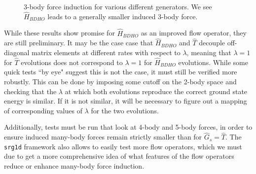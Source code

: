 \begin{figure}[th!]
\begin{center}
\end{center}
\caption{3-body force induction for various different generators. We see $\hat{H}_{BDHO}$ leads to a generally smaller induced 3-body force.}
\label{fig:heinz_newfull}
\end{figure}

While these results show promise for $\hat{H}_{BDHO}$ as an improved flow operator, they are still preliminary. It may be the case case that $\hat{H}_{BDHO}$ and $\hat{T}$ decouple off-diagonal matrix elements at different rates with respect to $\lambda$, meaning that $\lambda=1$ for $\hat{T}$ evolutions does not correspond to $\lambda=1$ for $\hat{H}_{BDHO}$ evolutions. While some quick tests ``by eye" suggest this is not the case, it must still be verified more robustly. This can be done by imposing some cutoff on the 2-body space and checking that the $\lambda$ at which both evolutions reproduce the correct ground state energy is similar. If it is not similar, it will be necessary to figure out a mapping of corresponding values of $\lambda$ for the two evolutions.

Additionally, tests must be run that look at 4-body and 5-body forces, in order to ensure induced many-body forces remain strictly smaller than for $\hat{G}_s=\hat{T}$. The \texttt{srg1d} framework also allows to easily test more flow operators, which we must due to get a more comprehensive idea of what features of the flow operators reduce or enhance many-body force induction.



